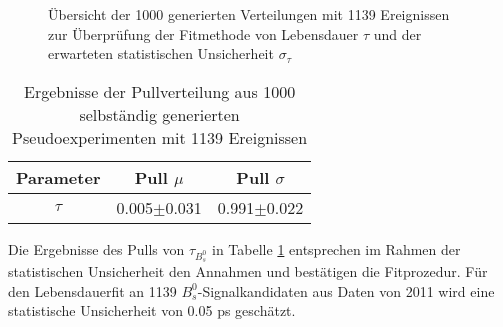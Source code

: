 \documentclass{article}
\begin{document}
\begin{figure}[h!]
\begin{centering}
\addtocounter{subfigure}{-1}
\end{centering}
\caption{Übersicht der 1000 generierten Verteilungen mit 1139 Ereignissen zur Überprüfung der Fitmethode von Lebensdauer $\tau$ und der erwarteten statistischen Unsicherheit $\sigma_{\tau}$}
\label{fig:toytau}
\end{figure} 

\begin{table}[h!]
\noindent \begin{centering}\begin{tabular}{c|c|c}
Parameter&Pull $\mu$ &Pull $\sigma$ \tabularnewline
\hline 
$\tau$&0.005$\pm$0.031&0.991$\pm$0.022 \tabularnewline 
\end{tabular}
\par\end{centering}
\caption{Ergebnisse der Pullverteilung aus 1000 selbständig generierten Pseudoexperimenten mit 1139 Ereignissen}
\label{table:toy}
\end{table}

Die Ergebnisse des Pulls von $\tau_{B_s^0}$ in Tabelle \ref{table:toy} entsprechen im Rahmen der statistischen Unsicherheit den Annahmen und bestätigen die Fitprozedur. Für den Lebensdauerfit an 1139  $B_s^0$-Signalkandidaten aus Daten von 2011 wird eine statistische Unsicherheit von 0.05 ps geschätzt.
\end{document}
